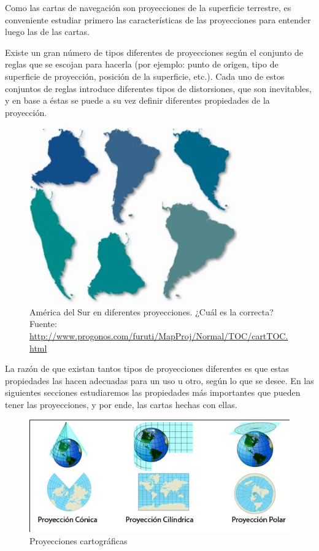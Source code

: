 Como las cartas de navegación son proyecciones de la superficie terrestre, es conveniente estudiar primero las características de las proyecciones para entender luego las de las cartas. 

 Existe un gran número de tipos diferentes de proyecciones según el conjunto de reglas que se escojan para hacerla (por ejemplo: punto de origen, tipo de superficie de proyección, posición de la superficie, etc.). Cada uno de estos conjuntos de reglas introduce diferentes tipos de distorsiones, que son inevitables, y en base a éstas se puede a su vez definir diferentes propiedades de la proyección.

\begin{figure}[!h]
  \centering
  \includegraphics[width=0.8\textwidth]{06.radionavegacion/Imagenes/comparacion-proyecciones.jpg}
  \caption{Am\'erica del Sur en diferentes proyecciones. ¿Cu\'al es la correcta? \\{\footnotesize Fuente: \url{http://www.progonos.com/furuti/MapProj/Normal/TOC/cartTOC.html}}}
  \label{fig:comparacion.proyecciones.cartograficas}
\end{figure}


La razón de que existan tantos tipos de proyecciones diferentes es que estas propiedades las hacen adecuadas para un uso u otro, según lo que se desee. En las siguientes secciones estudiaremos las propiedades más importantes que pueden tener las proyecciones, y por ende, las cartas hechas con ellas. 

\begin{figure}[!h]
  \centering
  \includegraphics[width=\textwidth]{06.radionavegacion/Imagenes/proyecciones.jpg}
  \caption{Proyecciones cartogr\'aficas}
  \label{fig:proyecciones.cartograficas}
\end{figure}

